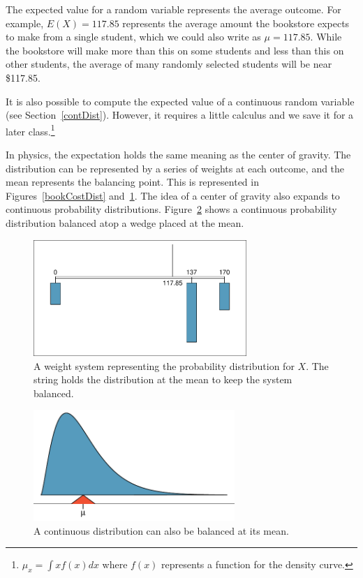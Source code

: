 The expected value for a random variable represents the average outcome. For example, $E(X)=117.85$ represents the average amount the bookstore expects to make from a single student, which we could also write as $\mu=117.85$. While the bookstore will make more than this on some students and less than this on other students, the average of many randomly selected students will be near \$117.85.

\textPE{\pagebreak}

It is also possible to compute the expected value of a continuous random variable (see Section~\ref{contDist}). However, it requires a little calculus and we save it for a later class.\footnote{$\mu_x = \int xf(x)dx$ where $f(x)$ represents a function for the density curve.}

In physics, the expectation holds the same meaning as the center of gravity. The distribution can be represented by a series of weights at each outcome, and the mean represents the balancing point. This is represented in Figures~\ref{bookCostDist} and~\ref{bookWts}. The idea of a center of gravity also expands to continuous probability distributions. Figure~\ref{contBalance} shows a continuous probability distribution balanced atop a wedge placed at the mean.

\begin{figure}
\centering
\includegraphics[width=0.72\textwidth]{ch_probability/figures/bookWts/bookWts}
\caption{A weight system representing the probability distribution for $X$. The string holds the distribution at the mean to keep the system balanced.}
\label{bookWts}
\end{figure}

\begin{figure}
\centering
\includegraphics[width=0.68\textwidth]{ch_probability/figures/contBalance/contBalance}
\caption{A continuous distribution can also be balanced at its mean.}
\label{contBalance}
\end{figure}

